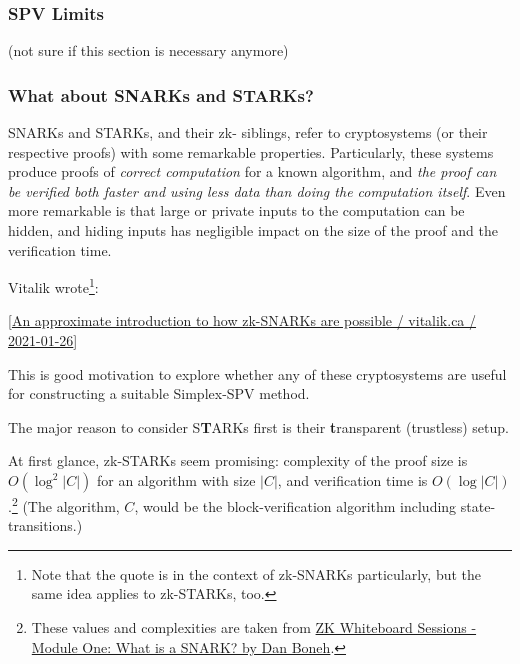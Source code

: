 \begin{draftonly}
\subsubsection{SPV Limits}

(not sure if this section is necessary anymore)







\subsubsection{What about SNARKs and STARKs?}

SNARKs and STARKs, and their zk- siblings, refer to cryptosystems (or their respective proofs) with some remarkable properties.
Particularly, these systems produce proofs of \emph{correct computation} for a known algorithm, and \emph{the proof can be verified both faster and using less data than doing the computation itself}.
Even more remarkable is that large or private inputs to the computation can be hidden, and hiding inputs has negligible impact on the size of the proof and the verification time.

Vitalik wrote\footnote{
    Note that the quote is in the context of zk-SNARKs particularly, but the same idea applies to zk-STARKs, too.
}:

[\href{https://vitalik.ca/general/2021/01/26/snarks.html}{An approximate introduction to how zk-SNARKs are possible / vitalik.ca / 2021-01-26}]

This is good motivation to explore whether any of these cryptosystems are useful for constructing a suitable Simplex-SPV method.


The major reason to consider S\textbf{T}ARKs first is their \textbf{t}ransparent (trustless) setup.

At first glance, zk-STARKs seem promising: complexity of the proof size is $O(\log^2 |C|)$ for an algorithm with size $|C|$, and verification time is $O(\log |C|)$.\footnote{
    These values and complexities are taken from \href{https://www.youtube.com/watch?v=h-94UhJLeck&t=1519s}{ZK Whiteboard Sessions - Module One: What is a SNARK? by Dan Boneh}.
}
(The algorithm, $C$, would be the block-verification algorithm including state-transitions.)


\end{draftonly}
